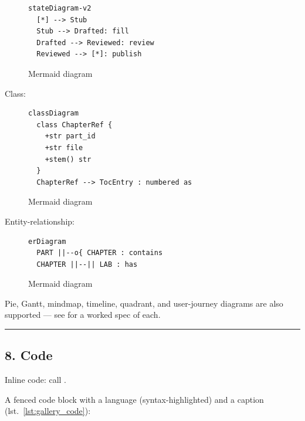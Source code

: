 \documentclass[
]{article}
\theoremstyle{plain}
\theoremstyle{definition}
\begin{document}
\begin{figure}[htbp]
\centering
\begin{verbatim}
stateDiagram-v2
  [*] --> Stub
  Stub --> Drafted: fill
  Drafted --> Reviewed: review
  Reviewed --> [*]: publish
\end{verbatim}
\caption{Mermaid diagram}
\end{figure}

Class:

\begin{figure}[htbp]
\centering
\begin{verbatim}
classDiagram
  class ChapterRef {
    +str part_id
    +str file
    +stem() str
  }
  ChapterRef --> TocEntry : numbered as
\end{verbatim}
\caption{Mermaid diagram}
\end{figure}

Entity-relationship:

\begin{figure}[htbp]
\centering
\begin{verbatim}
erDiagram
  PART ||--o{ CHAPTER : contains
  CHAPTER ||--|| LAB : has
\end{verbatim}
\caption{Mermaid diagram}
\end{figure}

Pie, Gantt, mindmap, timeline, quadrant, and user-journey diagrams are
also supported --- see  for a
worked spec of each.

\begin{center}\rule{0.5\linewidth}{0.5pt}\end{center}

\subsection{8. Code}\label{code}

Inline code: call
.

A fenced code block with a language (syntax-highlighted) and a caption
(lst.~\ref{lst:gallery_code}):
\end{document}
